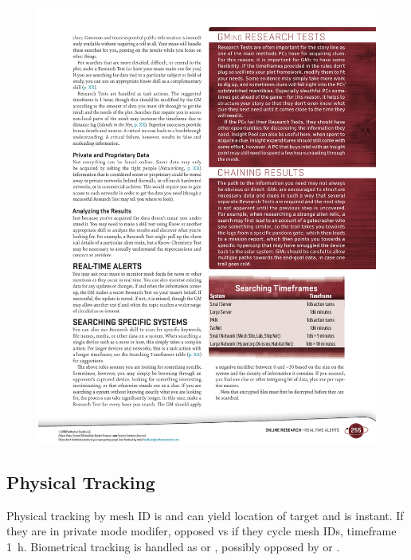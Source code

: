 \begin{figure}[htbp!]%
   \includegraphics[scale=0.9]{gfx/mesh-search-time}%
\end{figure}%


\subsection*{Physical Tracking}

\begin{itemize}
   \itembox Physical tracking by mesh ID is  and can yield location of target and is instant. If they are in private mode  modifer, opposed vs  if they cycle mesh IDs, timeframe \SI{1}{h}.
   \itembox Biometrical tracking is handled as  or , possibly opposed by  or .
\end{itemize}


